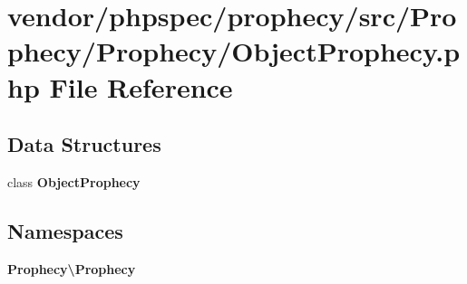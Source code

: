 \section{vendor/phpspec/prophecy/src/\+Prophecy/\+Prophecy/\+Object\+Prophecy.php File Reference}
\label{_object_prophecy_8php}
\subsection*{Data Structures}
\begin{DoxyCompactItemize}
\item 
class {\bf Object\+Prophecy}
\end{DoxyCompactItemize}
\subsection*{Namespaces}
\begin{DoxyCompactItemize}
\item 
 {\bf Prophecy\textbackslash{}\+Prophecy}
\end{DoxyCompactItemize}
